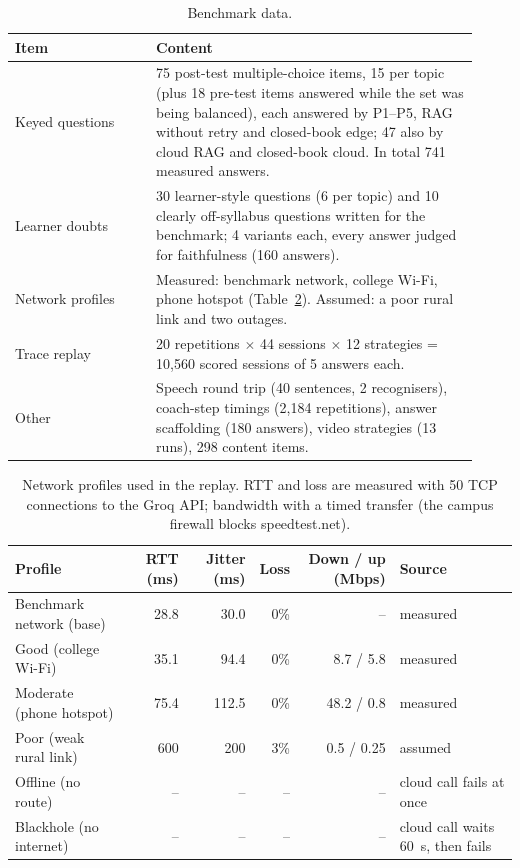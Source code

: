 \begin{table}[htbp]
  \centering
  \caption{Benchmark data.}
  \label{tab:datasets}
  \begin{tabular}{p{0.28\linewidth}p{0.64\linewidth}}
    \toprule
    Item & Content \\
    \midrule
    Keyed questions & 75 post-test multiple-choice items, 15 per topic (plus 18 pre-test items answered
      while the set was being balanced), each answered by P1--P5, RAG without retry and closed-book
      edge; 47 also by cloud RAG and closed-book cloud. In total 741 measured answers. \\
    Learner doubts & 30 learner-style questions (6 per topic) and 10 clearly off-syllabus questions written
      for the benchmark; 4 variants each, every answer judged for faithfulness (160 answers). \\
    Network profiles & Measured: benchmark network, college Wi-Fi, phone hotspot (Table~\ref{tab:networks}).
      Assumed: a poor rural link and two outages. \\
    Trace replay & 20 repetitions $\times$ 44 sessions $\times$ 12 strategies = 10{,}560 scored sessions
      of 5 answers each. \\
    Other & Speech round trip (40 sentences, 2 recognisers), coach-step timings (2{,}184 repetitions),
      answer scaffolding (180 answers), video strategies (13 runs), 298 content items. \\
    \bottomrule
  \end{tabular}
\end{table}

\begin{table}[htbp]
  \centering
  \caption{Network profiles used in the replay. RTT and loss are measured with 50 TCP connections to the
    Groq API; bandwidth with a timed transfer (the campus firewall blocks speedtest.net).}
  \label{tab:networks}
  \begin{tabular}{lrrrrl}
    \toprule
    Profile & RTT (ms) & Jitter (ms) & Loss & Down / up (Mbps) & Source \\
    \midrule
    Benchmark network (base) & 28.8 & 30.0 & 0\% & -- & measured \\
    Good (college Wi-Fi) & 35.1 & 94.4 & 0\% & 8.7 / 5.8 & measured \\
    Moderate (phone hotspot) & 75.4 & 112.5 & 0\% & 48.2 / 0.8 & measured \\
    Poor (weak rural link) & 600 & 200 & 3\% & 0.5 / 0.25 & assumed \\
    Offline (no route) & -- & -- & -- & -- & cloud call fails at once \\
    Blackhole (no internet) & -- & -- & -- & -- & cloud call waits 60~s, then fails \\
    \bottomrule
  \end{tabular}
\end{table}

